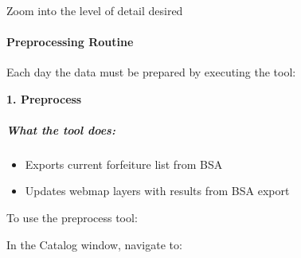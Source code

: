   \\
  
  \begin{flushright}
\lookArrow
\end{flushright}
  \vspace{.1in}

  \vspace{2in}
  
  
  \vspace{.25in}
  
\begin{flushright}
\lookArrow
\end{flushright}
  
  \noindent Zoom into the level of detail desired
    
 \vspace{1in}
  
  {\btn{} \lookArrow}
  
  \clearpage
  
 \paragraph{Preprocessing Routine}

 \vspace{.2in}

 Each day the data must be prepared by executing the tool:
 \vspace{.2in}

 \textbf{1. Preprocess}

 \vspace{.2in}

  \subparagraph*{What the tool does:}
  \vspace{.15in}

  \begin{itemize}
  \item Exports current forfeiture list from BSA
  \item Updates webmap layers with results from BSA export
  \end{itemize}
  To use the preprocess tool:
 \vspace{.15in}

 \noindent In the Catalog window, navigate to:

